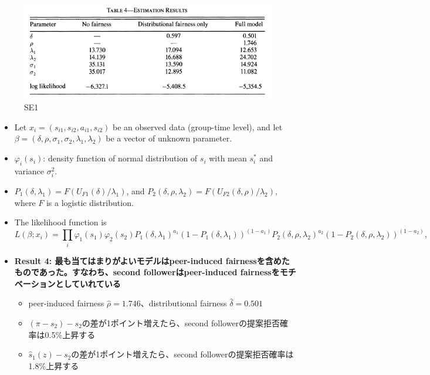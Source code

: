 \documentclass[../root]{subfiles}
\begin{document}
    \begin{figure}
    \centering
    \includegraphics[width = 0.8\linewidth]{1009kato/95459869-29ca9080-09af-11eb-8a0a-5ffedd720099.png}
    \caption{SE1}
    \end{figure}

    \begin{itemize}
    
    \item
      Let \(x_i = (s_{i1}, s_{i2}, a_{i1}, s_{i2})\) be an observed data (group-time level), and let \(\beta = (\delta, \rho, \sigma_1, \sigma_2, \lambda_1, \lambda_2)\) be a vector of unknown parameter.
    \item
      \(\varphi_i(s_i)\): density function of normal distribution of \(s_i\) with mean \(s^*_i\) and variance \(\sigma_i^2\).
    \item
      \(P_1(\delta, \lambda_1) = F(U_{F1}(\delta)/\lambda_1)\), and \(P_2(\delta, \rho, \lambda_2) = F(U_{F2}(\delta,\rho)/\lambda_2)\), where \(F\) is a logistic distribution.
    \item
      The likelihood function is
      \begin{equation}
      L(\beta; x_i) =
      \prod_i
      \varphi_1(s_1) \varphi_2(s_2)
      P_1(\delta, \lambda_1)^{a_1} (1 - P_1(\delta, \lambda_1))^{(1 - a_1)}
      P_2(\delta, \rho, \lambda_2)^{a_2} (1 - P_2(\delta, \rho, \lambda_2))^{(1 - a_2)},
      \end{equation}
    \item
      \textbf{Result 4: 最も当てはまりがよいモデルはpeer-induced fairnessを含めたものであった。すなわち、second followerはpeer-induced fairnessをモチベーションとしていれている}

      \begin{itemize}
      
      \item
        peer-induced fairness \(\hat{\rho} = 1.746\)、distributional fairness \(\hat{\delta} = 0.501\)
      \item
        \((\pi - s_2) - s_2\)の差が1ポイント増えたら、second followerの提案拒否確率は0.5\%上昇する
      \item
        \(\hat{s}_1(z) - s_2\)の差が1ポイント増えたら、second followerの提案拒否確率は1.8\%上昇する
      \end{itemize}
    \end{itemize}
\end{document}
